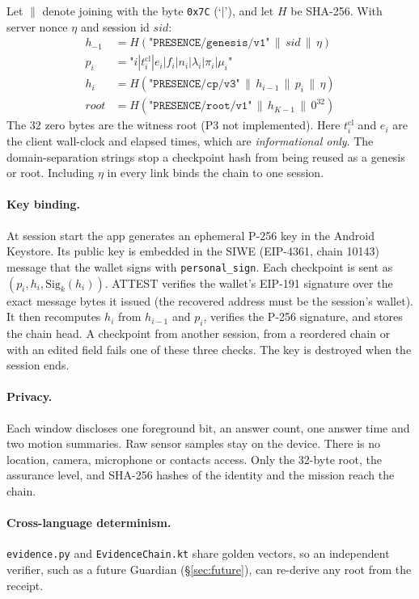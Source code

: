 \documentclass[10pt]{article}
\newcommand{\code}[1]{\texttt{\small #1}}
\begin{document}
Let $\|$ denote joining with the byte \code{0x7C} (`$|$'), and let $H$ be SHA-256. With server nonce $\eta$ and session
id $\textit{sid}$:
\begin{align}
h_{-1}&=H(\texttt{"PRESENCE/genesis/v1"}\,\|\,\textit{sid}\,\|\,\eta) \label{eq:gen}\\
p_i&=\texttt{"}i|t^{\text{cl}}_i|e_i|f_i|n_i|\lambda_i|\pi_i|\mu_i\texttt{"}\\
h_i&=H(\texttt{"PRESENCE/cp/v3"}\,\|\,h_{i-1}\,\|\,p_i\,\|\,\eta)\\
\textit{root}&=H(\texttt{"PRESENCE/root/v1"}\,\|\,h_{K-1}\,\|\,0^{32}) \label{eq:root}
\end{align}
The 32 zero bytes are the witness root (P3 not implemented). Here $t^{\text{cl}}_i$ and $e_i$ are the client wall-clock
and elapsed times, which are \emph{informational only}. The domain-separation strings stop a checkpoint hash from being
reused as a genesis or root. Including $\eta$ in every link binds the chain to one session.

\paragraph{Key binding.} At session start the app generates an ephemeral P-256 key in the Android Keystore. Its public
key is embedded in the SIWE (EIP-4361, chain 10143) message that the wallet signs with \code{personal\_sign}. Each
checkpoint is sent as $(p_i, h_i, \mathrm{Sig}_{k}(h_i))$. ATTEST verifies the wallet's EIP-191 signature over the exact
message bytes it issued (the recovered address must be the session's wallet). It then recomputes $h_i$ from $h_{i-1}$ and
$p_i$, verifies the P-256 signature, and stores the chain head. A checkpoint from another session, from a reordered chain
or with an edited field fails one of these three checks. The key is destroyed when the session ends.

\paragraph{Privacy.} Each window discloses one foreground bit, an answer count, one answer time and two motion
summaries. Raw sensor samples stay on the device. There is no location, camera, microphone or contacts access. Only the
32-byte root, the assurance level, and SHA-256 hashes of the identity and the mission reach the chain.

\paragraph{Cross-language determinism.} \code{evidence.py} and \code{EvidenceChain.kt} share golden vectors, so an
independent verifier, such as a future Guardian (\S\ref{sec:future}), can re-derive any root from the receipt.
\end{document}
